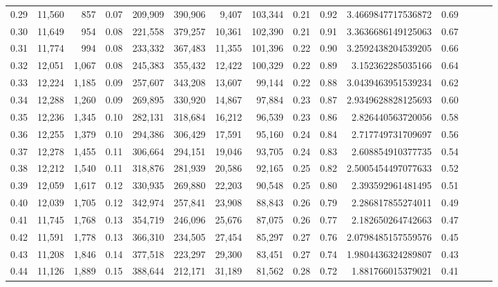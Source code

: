 \begin{tabular}{rrrrrrrrrrrrrrr}
0.29 &  11,560 &    857 &  0.07 &  209,909 &  390,906 &    9,407 &  103,344 &  0.21 &  0.92 &    3.4669847717536872 &      0.69 \\
0.30 &  11,649 &    954 &  0.08 &  221,558 &  379,257 &   10,361 &  102,390 &  0.21 &  0.91 &    3.3636686149125063 &      0.67 \\
0.31 &  11,774 &    994 &  0.08 &  233,332 &  367,483 &   11,355 &  101,396 &  0.22 &  0.90 &    3.2592438204539205 &      0.66 \\
0.32 &  12,051 &  1,067 &  0.08 &  245,383 &  355,432 &   12,422 &  100,329 &  0.22 &  0.89 &     3.152362285035166 &      0.64 \\
0.33 &  12,224 &  1,185 &  0.09 &  257,607 &  343,208 &   13,607 &   99,144 &  0.22 &  0.88 &    3.0439463951539234 &      0.62 \\
0.34 &  12,288 &  1,260 &  0.09 &  269,895 &  330,920 &   14,867 &   97,884 &  0.23 &  0.87 &    2.9349628828125693 &      0.60 \\
0.35 &  12,236 &  1,345 &  0.10 &  282,131 &  318,684 &   16,212 &   96,539 &  0.23 &  0.86 &     2.826440563720056 &      0.58 \\
0.36 &  12,255 &  1,379 &  0.10 &  294,386 &  306,429 &   17,591 &   95,160 &  0.24 &  0.84 &     2.717749731709697 &      0.56 \\
0.37 &  12,278 &  1,455 &  0.11 &  306,664 &  294,151 &   19,046 &   93,705 &  0.24 &  0.83 &     2.608854910377735 &      0.54 \\
0.38 &  12,212 &  1,540 &  0.11 &  318,876 &  281,939 &   20,586 &   92,165 &  0.25 &  0.82 &    2.5005454497077633 &      0.52 \\
0.39 &  12,059 &  1,617 &  0.12 &  330,935 &  269,880 &   22,203 &   90,548 &  0.25 &  0.80 &     2.393592961481495 &      0.51 \\
0.40 &  12,039 &  1,705 &  0.12 &  342,974 &  257,841 &   23,908 &   88,843 &  0.26 &  0.79 &     2.286817855274011 &      0.49 \\
0.41 &  11,745 &  1,768 &  0.13 &  354,719 &  246,096 &   25,676 &   87,075 &  0.26 &  0.77 &     2.182650264742663 &      0.47 \\
0.42 &  11,591 &  1,778 &  0.13 &  366,310 &  234,505 &   27,454 &   85,297 &  0.27 &  0.76 &    2.0798485157559576 &      0.45 \\
0.43 &  11,208 &  1,846 &  0.14 &  377,518 &  223,297 &   29,300 &   83,451 &  0.27 &  0.74 &    1.9804436324289807 &      0.43 \\
0.44 &  11,126 &  1,889 &  0.15 &  388,644 &  212,171 &   31,189 &   81,562 &  0.28 &  0.72 &     1.881766015379021 &      0.41 \\

\end{tabular}
